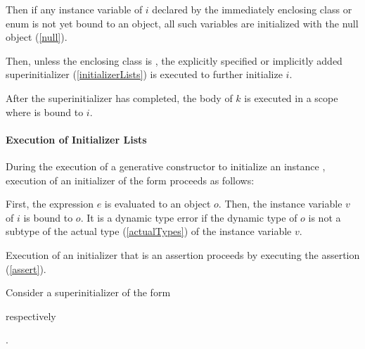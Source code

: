 \documentclass[makeidx]{article}
\begin{document}

\LMHash{}%
Then if any instance variable of $i$ declared
by the immediately enclosing class or enum
is not yet bound to an object,
all such variables are initialized with the null object (\ref{null}).

\LMHash{}%
Then, unless the enclosing class is , the explicitly specified or
implicitly added superinitializer (\ref{initializerLists}) is executed to
further initialize $i$.

\LMHash{}%
After the superinitializer has completed, the body of $k$ is executed
in a scope where \THIS{} is bound to $i$.



\paragraph{Execution of Initializer Lists}

\LMHash{}%
During the execution of a generative constructor to initialize an instance
,
execution of an initializer of the form 
proceeds as follows:

\LMHash{}%
First, the expression $e$ is evaluated to an object $o$.
Then, the instance variable $v$ of $i$ is bound to $o$.
It is a dynamic type error if the dynamic type of $o$ is not
a subtype of the actual type
(\ref{actualTypes})
of the instance variable $v$.

\LMHash{}%
Execution of an initializer that is an assertion proceeds by
executing the assertion (\ref{assert}).

\LMHash{}%
Consider a superinitializer  of the form

\noindent
{}
respectively

\noindent
{}.
\end{document}
